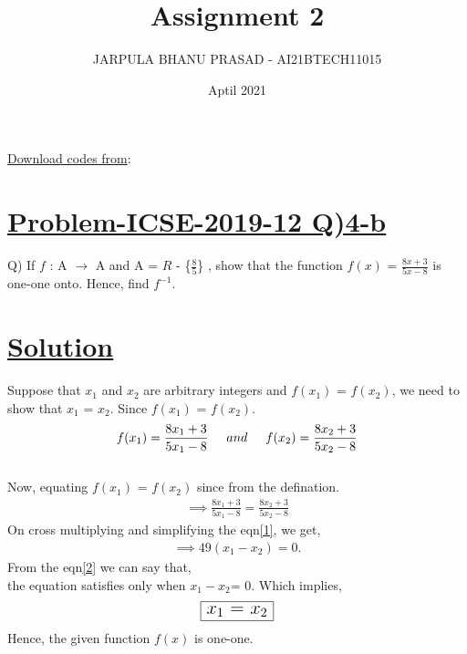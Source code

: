\documentclass[journal,12pt,twocolumn]{IEEEtran}
\title{Assignment 2}
\author{JARPULA BHANU PRASAD - AI21BTECH11015}
\date{Aptil 2021}
\begin{document}
\maketitle
\noindent \Large\underline{Download codes from}:

\section{\Large\underline{Problem-ICSE-2019-12 Q)4-b}}
\large\noindent Q) If $f$ : A $\rightarrow$ A and A = $R$ - \{$\frac{8}{5}$\} , show that the function $f(x)$ = $\frac{8x+3}{5x-8}$ is one-one onto. Hence, find $f^{-1}$. 
\section{\large\underline{Solution}}
\vspace{5mm}

\noindent Suppose that $x_1$ and $x_2$ are arbitrary integers and $f(x_1)$ = $f(x_2)$, we need to show that $x_1$ = $x_2$. Since $f(x_1)$ = $f(x_2)$.\\
\begin{align*}
f(x_1)=\frac{8x_1+3}{5x_1-8} \hspace{5mm} and \hspace{5mm} f(x_2)=\frac{8x_2+3}{5x_2-8}
\end{align*}\\
\noindent Now, equating $f(x_1)$ = $f(x_2)$ since from the defination.
\begin{align} \label{1}
\implies \frac{8x_1+3}{5x_1-8} = \frac{8x_2+3}{5x_2-8}
\end{align}
On cross multiplying and simplifying the eqn\eqref{1}, we get,
\begin{align} \label{2}
\implies 49(x_1 - x_2) = 0.
\end{align}
From the eqn\eqref{2} we can say that,\\ the equation satisfies only when $x_1 - x_2$= 0. Which implies,
\begin{align*}
\Large\framebox[1.2\width]{$x_1$ = $x_2$}
\end{align*}
Hence, the given function $f(x)$ is one-one.
\end{document}
